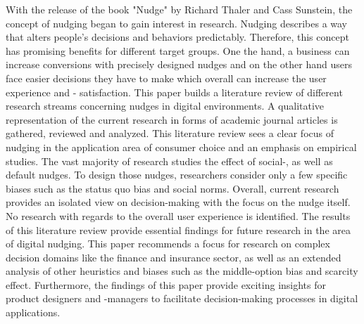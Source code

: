With the release of the book "Nudge" by Richard Thaler and Cass Sunstein, the concept of nudging began to gain interest in research. Nudging describes a way that alters people's decisions and behaviors predictably. Therefore, this concept has promising benefits for different target groups. One the hand, a business can increase conversions with precisely designed nudges and on the other hand users face easier decisions they have to make which overall can increase the user experience and - satisfaction. This paper builds a literature review of different research streams concerning nudges in digital environments. A qualitative representation of the current research in forms of academic journal articles is gathered, reviewed and analyzed.
This literature review sees a clear focus of nudging in the application area of consumer choice and an emphasis on empirical studies. The vast majority of research studies the effect of social-, as well as default nudges. To design those nudges, researchers consider only a few specific biases such as the status quo bias and social norms. Overall, current research provides an isolated view on decision-making with the focus on the nudge itself. No research with regards to the overall user experience is identified. The results of this literature review provide essential findings for future research in the area of digital nudging. This paper recommends a focus for research on complex decision domains like the finance and insurance sector, as well as an extended analysis of other heuristics and biases such as the middle-option bias and scarcity effect. Furthermore, the findings of this paper provide exciting insights for product designers and -managers to facilitate decision-making processes in digital applications.
